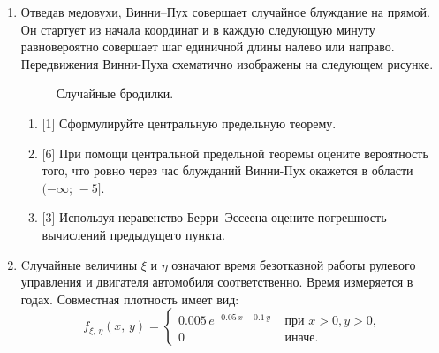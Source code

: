 \documentclass[12pt, a4paper]{article}\usepackage[]{graphicx}\usepackage[]{color}
\begin{document}
\begin{enumerate}
							\item Отведав медовухи, Винни–Пух совершает случайное блуждание на прямой. Он стартует из начала координат и в каждую следующую минуту равновероятно совершает шаг единичной длины налево или направо. Передвижения Винни-Пуха схематично изображены на следующем рисунке.
							\begin{figure}[h]
								\noindent{}
								\caption{Случайные бродилки.}
								\label{wun762hkej}
							\end{figure}
							\begin{enumerate}
								\item{} [1] Сформулируйте центральную предельную теорему.
								\item{} [6] При помощи центральной предельной теоремы оцените вероятность того, что ровно через час блужданий Винни-Пух окажется в области $(-\infty; \, -5]$.
								\item{} [3] Используя неравенство Берри–Эссеена оцените погрешность вычислений предыдущего пункта.
							\end{enumerate}


							\newpage
							\item
							Cлучайные величины $\xi$ и $\eta$ означают время безотказной работы рулевого управления и двигателя автомобиля соответственно. Время измеряется в годах. Совместная плотность имеет вид:
							\[
							f_{\xi, \,\eta}(x,\,y) =
							\begin{cases}
							0.005\,e^{-0.05\,x-0.1\,y} & \text{ при } x > 0, y > 0, \\
							0                    & \text{ иначе.}
							\end{cases}
							\]


\end{enumerate}
\end{document}
